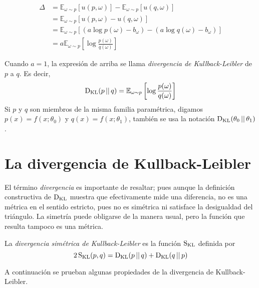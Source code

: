 \documentclass[main.tex]{subfiles}
\begin{document}
\begin{align*}
	\Delta &= \mathbb{E}_{\omega \sim p}\left[u(p, \omega)\right] - \mathbb{E}_{\omega\sim p}\left[u(q, \omega)\right]  \\
	&= \mathbb{E}_{\omega \sim p}\left[u(p, \omega) - u(q, \omega)\right] \\
	&= \mathbb{E}_{\omega \sim p}\left[(a\log p(\omega) - b_\omega) - (a\log q(\omega) - b_\omega) \right] \\
	&= a\mathbb{E}_{\omega \sim p}\left[\log\frac{p(\omega)}{q(\omega)}\right]
\end{align*}

\begin{definition}
	Cuando $a=1$, la expresión de arriba se llama \textit{divergencia de Kullback-Leibler} de $p$ a $q$. Es decir, 
	\begin{equation*}
	\operatorname*{D_{KL}}(p \operatorname*{\mid\mid} q) = \mathbb{E}_{\omega \sim p}\left[\log\frac{p(\omega)}{q(\omega)}\right]	
	\end{equation*}
Si $p$ y $q$ son miembros de la misma familia paramétrica, digamos $p(x)=f(x; \theta_0)$ y $q(x)=f(x; \theta_1)$, también se usa la notación $\operatorname*{D_{KL}}(\theta_0\operatorname*{\mid\mid}\theta_1)$.
\end{definition}

\section{La divergencia de Kullback-Leibler}
El término \textit{divergencia} es importante de resaltar; pues aunque la definición constructiva de $\operatorname*{D_{KL}}$ muestra que efectivamente mide una diferencia, no es una métrica en el sentido estricto, pues no es simétrica ni satisface la desigualdad del triángulo. La simetría puede obligarse de la manera usual, pero la función que resulta tampoco es una métrica.

\begin{definition}
La \textit{divergencia simétrica de Kullback-Leibler} es la función $\operatorname*{S_{KL}}$ definida por
\begin{equation*}
2\operatorname*{S_{KL}}(p, q) = \operatorname*{D_{KL}}(p\operatorname*{\mid\mid} q) + \operatorname*{D_{KL}}(q \operatorname*{\mid\mid} p)	
\end{equation*}
\end{definition}

A continuación se prueban algunas propiedades de la divergencia de Kullback-Leibler.
\end{document}
